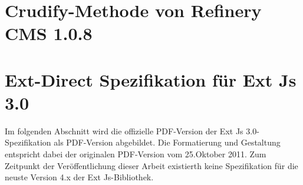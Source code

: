 \section{Crudify-Methode von Refinery CMS 1.0.8}

\newpage
\section{Ext-Direct Spezifikation für Ext Js 3.0}
Im folgenden Abschnitt wird die offizielle PDF-Version der Ext Js 3.0-Spezifikation als PDF-Version abgebildet. Die Formatierung und Gestaltung entspricht dabei der originalen PDF-Version vom 25.Oktober 2011. Zum Zeitpunkt der Veröffentlichung dieser Arbeit existierth keine Spezifikation für die neuste Version 4.x der Ext Js-Bibliothek.
\label{extspec}

